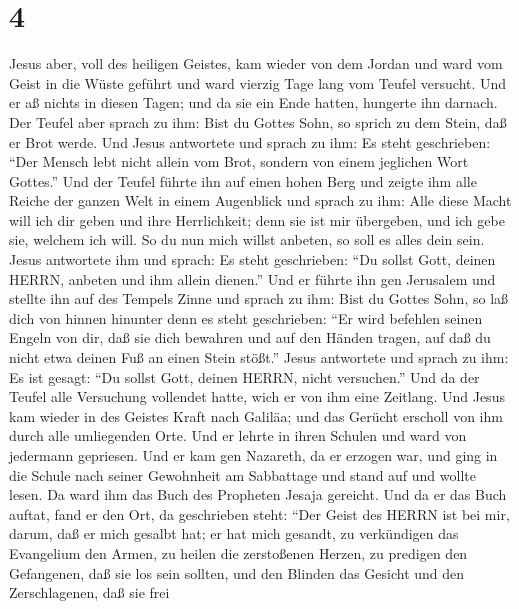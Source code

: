 \hypertarget{section-3}{%
\section{4}\label{section-3}}

 Jesus aber, voll des heiligen Geistes, kam wieder von dem
Jordan und ward vom Geist in die Wüste geführt  und ward
vierzig Tage lang vom Teufel versucht. Und er aß nichts in diesen Tagen;
und da sie ein Ende hatten, hungerte ihn darnach.  Der
Teufel aber sprach zu ihm: Bist du Gottes Sohn, so sprich zu dem Stein,
daß er Brot werde.  Und Jesus antwortete und sprach zu ihm:
Es steht geschrieben: ``Der Mensch lebt nicht allein vom Brot, sondern
von einem jeglichen Wort Gottes.''  Und der Teufel führte
ihn auf einen hohen Berg und zeigte ihm alle Reiche der ganzen Welt in
einem Augenblick  und sprach zu ihm: Alle diese Macht will
ich dir geben und ihre Herrlichkeit; denn sie ist mir übergeben, und ich
gebe sie, welchem ich will.  So du nun mich willst anbeten,
so soll es alles dein sein.  Jesus antwortete ihm und
sprach: Es steht geschrieben: ``Du sollst Gott, deinen HERRN, anbeten
und ihm allein dienen.''  Und er führte ihn gen Jerusalem
und stellte ihn auf des Tempels Zinne und sprach zu ihm: Bist du Gottes
Sohn, so laß dich von hinnen hinunter  denn es steht
geschrieben: ``Er wird befehlen seinen Engeln von dir, daß sie dich
bewahren  und auf den Händen tragen, auf daß du nicht etwa
deinen Fuß an einen Stein stößt.''  Jesus antwortete und
sprach zu ihm: Es ist gesagt: ``Du sollst Gott, deinen HERRN, nicht
versuchen.''  Und da der Teufel alle Versuchung vollendet
hatte, wich er von ihm eine Zeitlang.  Und Jesus kam wieder
in des Geistes Kraft nach Galiläa; und das Gerücht erscholl von ihm
durch alle umliegenden Orte.  Und er lehrte in ihren
Schulen und ward von jedermann gepriesen.  Und er kam gen
Nazareth, da er erzogen war, und ging in die Schule nach seiner
Gewohnheit am Sabbattage und stand auf und wollte lesen. 
Da ward ihm das Buch des Propheten Jesaja gereicht. Und da er das Buch
auftat, fand er den Ort, da geschrieben steht:  ``Der Geist
des HERRN ist bei mir, darum, daß er mich gesalbt hat; er hat mich
gesandt, zu verkündigen das Evangelium den Armen, zu heilen die
zerstoßenen Herzen, zu predigen den Gefangenen, daß sie los sein
sollten, und den Blinden das Gesicht und den Zerschlagenen, daß sie frei
